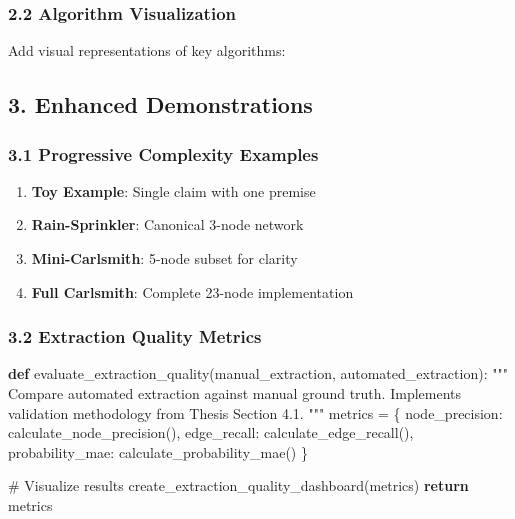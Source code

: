 \documentclass[
  11pt,
  letterpaper,
]{book}
\newenvironment{Shaded}{\begin{snugshade}}{\end{snugshade}}
\newcommand{\CommentTok}[1]{\textcolor[rgb]{0.37,0.37,0.37}{#1}}
\newcommand{\ControlFlowTok}[1]{\textcolor[rgb]{0.00,0.23,0.31}{\textbf{#1}}}
\newcommand{\KeywordTok}[1]{\textcolor[rgb]{0.00,0.23,0.31}{\textbf{#1}}}
\newcommand{\NormalTok}[1]{\textcolor[rgb]{0.00,0.23,0.31}{#1}}
\newcommand{\OperatorTok}[1]{\textcolor[rgb]{0.37,0.37,0.37}{#1}}
\newcommand{\StringTok}[1]{\textcolor[rgb]{0.13,0.47,0.30}{#1}}
\providecommand{\tightlist}{%
  \setlength{\itemsep}{0pt}\setlength{\parskip}{0pt}}
\begin{document}
\subsubsection{2.2 Algorithm
Visualization}\label{algorithm-visualization}

Add visual representations of key algorithms:

\subsection{3. Enhanced Demonstrations}\label{enhanced-demonstrations}

\subsubsection{3.1 Progressive Complexity
Examples}\label{progressive-complexity-examples}

\begin{enumerate}
\def\labelenumi{\arabic{enumi}.}
\tightlist
\item
  \textbf{Toy Example}: Single claim with one premise
\item
  \textbf{Rain-Sprinkler}: Canonical 3-node network
\item
  \textbf{Mini-Carlsmith}: 5-node subset for clarity
\item
  \textbf{Full Carlsmith}: Complete 23-node implementation
\end{enumerate}

\subsubsection{3.2 Extraction Quality
Metrics}\label{extraction-quality-metrics}

\begin{Shaded}
\begin{Highlighting}[]
\KeywordTok{def}\NormalTok{ evaluate\_extraction\_quality(manual\_extraction, automated\_extraction):}
    \CommentTok{"""}
\CommentTok{    Compare automated extraction against manual ground truth.}
\CommentTok{    Implements validation methodology from Thesis Section 4.1.}
\CommentTok{    """}
\NormalTok{    metrics }\OperatorTok{=}\NormalTok{ \{}
        \StringTok{\textquotesingle{}node\_precision\textquotesingle{}}\NormalTok{: calculate\_node\_precision(),}
        \StringTok{\textquotesingle{}edge\_recall\textquotesingle{}}\NormalTok{: calculate\_edge\_recall(),}
        \StringTok{\textquotesingle{}probability\_mae\textquotesingle{}}\NormalTok{: calculate\_probability\_mae()}
\NormalTok{    \}}
    
    \CommentTok{\# Visualize results}
\NormalTok{    create\_extraction\_quality\_dashboard(metrics)}
    \ControlFlowTok{return}\NormalTok{ metrics}
\end{Highlighting}
\end{Shaded}
\end{document}
